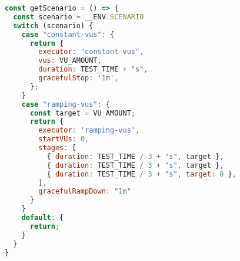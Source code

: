 \begin{lstlisting}[language=JavaScript,caption={K6 scenarios definition},breaklines=true,label={lst:k6Scenarios}]
const getScenario = () => {
  const scenario = __ENV.SCENARIO
  switch (scenario) {
    case "constant-vus": {
      return {
        executor: "constant-vus",
        vus: VU_AMOUNT,
        duration: TEST_TIME + "s",
        gracefulStop: '1m',
      };
    }
    case "ramping-vus": {
      const target = VU_AMOUNT;
      return {
        executor: 'ramping-vus',
        startVUs: 0,
        stages: [
          { duration: TEST_TIME / 3 + "s", target },
          { duration: TEST_TIME / 3 + "s", target },
          { duration: TEST_TIME / 3 + "s", target: 0 },
        ],
        gracefulRampDown: "1m"
      }
    }
    default: {
      return;
    }
  }
}
\end{lstlisting}
